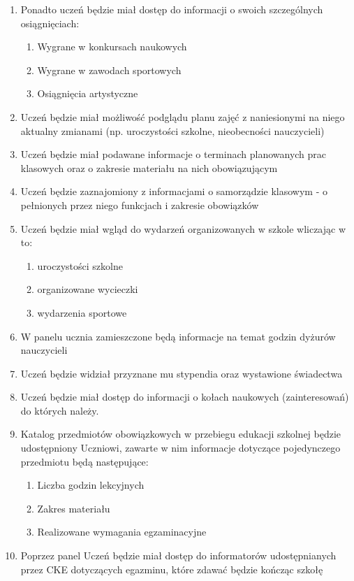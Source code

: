 \documentclass{article}
\begin{document}
\begin{enumerate}
\begin{enumerate}
	\end{enumerate}
	\item Ponadto uczeń będzie miał dostęp do informacji o swoich szczególnych osiągnięciach:
	\begin{enumerate}
		\item Wygrane w konkursach naukowych
		\item Wygrane w zawodach sportowych
		\item Osiągnięcia artystyczne
	\end{enumerate}
	\item Uczeń będzie miał możliwość podglądu planu zajęć z naniesionymi na niego aktualny zmianami  (np. uroczystości szkolne, nieobecności nauczycieli)
	\item Uczeń będzie miał podawane informacje o terminach planowanych prac klasowych oraz o zakresie materiału na nich obowiązującym
	\item Uczeń będzie zaznajomiony z informacjami o samorządzie klasowym - o pełnionych przez niego funkcjach i zakresie obowiązków
	\item Uczeń będzie miał wgląd do wydarzeń organizowanych w szkole wliczając w to:
	\begin{enumerate}
		\item uroczystości szkolne
		\item organizowane wycieczki
		\item wydarzenia sportowe
	\end{enumerate}
	\item W panelu ucznia zamieszczone będą informacje na temat godzin dyżurów nauczycieli
	\item Uczeń będzie widział przyznane mu stypendia oraz wystawione świadectwa
	\item Uczeń będzie miał dostęp do informacji o kołach naukowych (zainteresowań) do których należy.
	\item Katalog przedmiotów obowiązkowych w przebiegu edukacji szkolnej będzie udostępniony Uczniowi, zawarte w nim informacje dotyczące pojedynczego przedmiotu będą następujące:
	\begin{enumerate}
		\item Liczba godzin lekcyjnych
		\item Zakres materiału
		\item Realizowane wymagania egzaminacyjne 
	\end{enumerate}
	\item Poprzez panel Uczeń będzie miał dostęp do informatorów udostępnianych przez CKE dotyczących egazminu, które zdawać będzie kończąc szkołę 

\end{enumerate}
\end{document}
